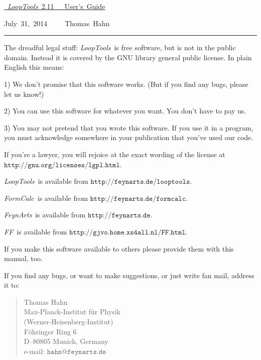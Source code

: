 \documentclass[twoside,12pt]{report}
\def\FA{\textit{FeynArts}}
\def\FC{\textit{FormCalc}}
\def\FF{\textit{FF}}
\def\LT{\textit{LoopTools}}
\def\Code#1{\ensuremath{\texttt{#1}}}
\begin{document}
\thispagestyle{empty}

\vspace*{.7\textheight}

\hfill\hbox{\underline{%
\vrule width 0pt height 0pt depth 2ex%
\Huge \LT~2.11~~~User's Guide}}

\vspace*{1ex}

\hfill\hbox{July 31, 2014~~~~~Thomas Hahn}

\clearpage

\vspace*{.5\textheight}
\vfill

\hrule

\medskip

\begin{scriptsize}
The dreadful legal stuff:
\LT\ is free software, but is not in the public domain.
Instead it is covered by the GNU library general public license.
In plain English this means:

1) We don't promise that this software works.   
(But if you find any bugs, please let us know!)

2) You can use this software for whatever you want.
You don't have to pay us.

3) You may not pretend that you wrote this software.
If you use it in a program, you must acknowledge
somewhere in your publication that you've used  
our code.

If you're a lawyer, you will rejoice at the exact wording of the license 
at \Code{http://gnu.org/licenses/lgpl.html}.

\LT\ is available from \Code{http://feynarts.de/looptools}.

\FC\ is available from \Code{http://feynarts.de/formcalc}.

\FA\ is available from \Code{http://feynarts.de}.

\FF\ is available from \Code{http://gjvo.home.xs4all.nl/FF.html}.

If you make this software available to others please provide them with
this manual, too.

If you find any bugs, or want to make suggestions, or just write fan mail,
address it to:
\vspace*{-2ex}
\begin{quote}
Thomas Hahn \\
Max-Planck-Institut f\"ur Physik \\
(Werner-Heisenberg-Institut) \\
F\"ohringer Ring 6 \\
D--80805 Munich, Germany \\
e-mail: \Code{hahn@feynarts.de}
\end{quote}
\end{scriptsize}
\end{document}
